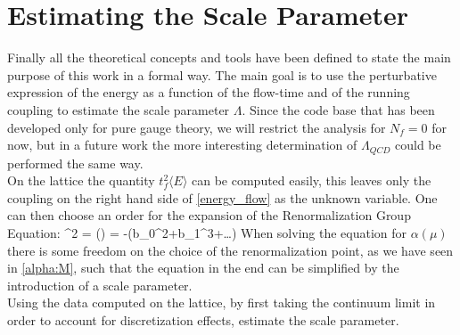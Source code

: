 \section{Estimating the Scale Parameter}
Finally all the theoretical concepts and tools have been defined to state the main purpose of this work in a formal way. The main goal is to use the perturbative expression of the energy as a function of the flow-time and of the running coupling to estimate the scale parameter $\Lambda$. Since the code base that has been developed only for pure gauge theory, we will restrict the analysis for $N_f = 0$ for now, but in a future work the more interesting determination of $\Lambda_{QCD}$ could be performed the same way. \\
On the lattice the quantity $t_f^2\langle E \rangle$ can be computed easily, this leaves only the coupling on the right hand side of \cref{energy_flow} as the unknown variable. One can then choose an order for the expansion of the Renormalization Group Equation:
\beq
\mu^2  = \beta(\alpha) = -(b_0\alpha^2+b_1\alpha^3+\dots)
\eeq
When solving the equation for $\alpha(\mu)$ there is some freedom on the choice of the renormalization point, as we have seen in \cref{alpha:M}, such that the equation in the end can be simplified by the introduction of a scale parameter.\\
Using the data computed on the lattice, by first taking the continuum limit in order to account for discretization effects, estimate the scale parameter.  

